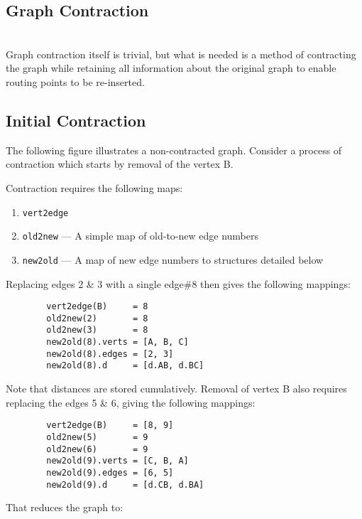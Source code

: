 \begin{spacing}{1.5}
    \section{Graph Contraction}\\

    \noindent Graph contraction itself is trivial, but what is needed is a method of contracting the graph while retaining all information about
    the original graph to enable routing points to be re-inserted.

    \vspace{12pt}\subsection{Initial Contraction}
    \noindent The following figure illustrates a non-contracted graph. Consider a process of contraction which starts by removal of the vertex B.

    

    Contraction requires the following maps:

    \begin{enumerate}
        \item{\tt vert2edge}
        \item{\tt old2new} --- A simple map of old-to-new edge numbers
        \item{\tt new2old} --- A map of new edge numbers to structures detailed below
    \end{enumerate}

    Replacing edges 2 \& 3 with a single edge\#8 then gives the following mappings:
    \begin{lstlisting}
        vert2edge(B)     = 8
        old2new(2)       = 8
        old2new(3)       = 8
        new2old(8).verts = [A, B, C]
        new2old(8).edges = [2, 3]
        new2old(8).d     = [d.AB, d.BC]
    \end{lstlisting}
    Note that distances are stored cumulatively. Removal of vertex B also requires replacing the edges 5 \& 6, giving the following mappings:
    \begin{lstlisting}
        vert2edge(B)     = [8, 9]
        old2new(5)       = 9
        old2new(6)       = 9
        new2old(9).verts = [C, B, A]
        new2old(9).edges = [6, 5]
        new2old(9).d     = [d.CB, d.BA]
    \end{lstlisting}

    That reduces the graph to:


\end{spacing}
